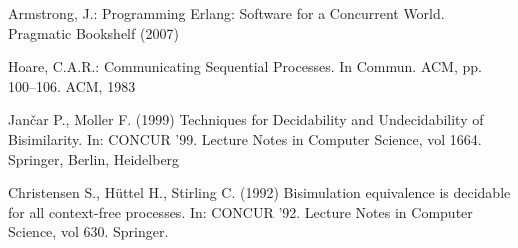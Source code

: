 \begin{thebibliography}{8}
Armstrong, J.: Programming Erlang: Software for a Concurrent World. Pragmatic Bookshelf (2007)

  Hoare, C.A.R.: Communicating Sequential Processes. In Commun. ACM, pp. 100--106. ACM, 1983

  Jančar P., Moller F. (1999) Techniques for Decidability and Undecidability of Bisimilarity. In: CONCUR '99. Lecture Notes in Computer Science, vol 1664. Springer, Berlin, Heidelberg

  Christensen S., Hüttel H., Stirling C. (1992) Bisimulation equivalence is decidable for all context-free processes. In: CONCUR '92. Lecture Notes in Computer Science, vol 630. Springer.

  


\end{thebibliography}



